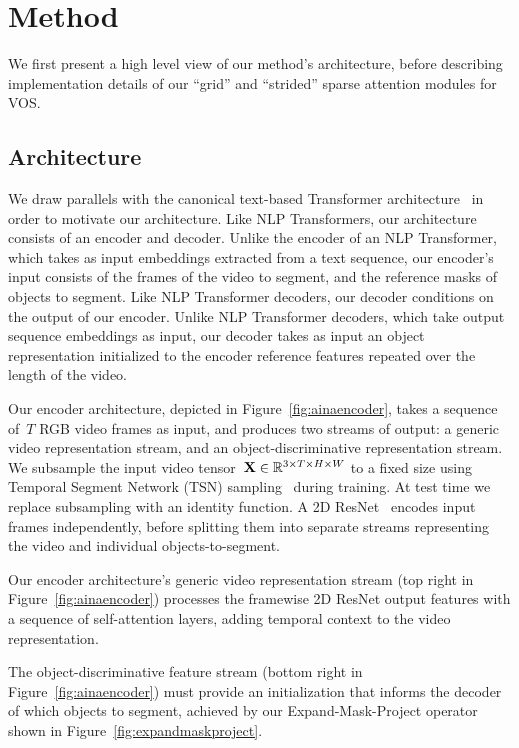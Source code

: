 \section{Method}

We first present a high level view of our method's architecture, before
describing implementation details of our ``grid'' and ``strided'' sparse
attention modules for VOS\@.


\subsection{Architecture}
\label{sec:architecture}

We draw parallels with the canonical text-based Transformer
architecture~\cite{vaswani2017attention} in order to motivate our architecture.
Like NLP Transformers, our architecture consists of an encoder and decoder.
Unlike the encoder of an NLP Transformer, which takes as input embeddings
extracted from a text sequence, our encoder's input consists of the frames of
the video to segment, and the reference masks of objects to segment.
Like NLP Transformer decoders, our decoder conditions on the output of our
encoder.
Unlike NLP Transformer decoders, which take output sequence embeddings as
input, our decoder takes as input an object representation initialized to the
encoder reference features repeated over the length of the video.

Our encoder architecture, depicted in Figure~\ref{fig:ainaencoder}, takes a
sequence of~$T$ RGB video frames as input, and produces two streams of output:
a generic video representation stream, and an object-discriminative
representation stream.
We subsample the input video
tensor~$\mathbf{X}{} \in \mathbb{R}{}^{3\times T \times H\times W}$ to a fixed size
using Temporal Segment Network (TSN) sampling~\cite{wang2016temporal} during
training.
At test time we replace subsampling with an identity function.
A 2D ResNet~\cite{he2016deep} encodes input frames independently, before
splitting them into separate streams representing the video and individual
objects-to-segment.

Our encoder architecture's generic video representation stream (top right in
Figure~\ref{fig:ainaencoder}) processes the framewise 2D ResNet output features
with a sequence of self-attention layers, adding temporal context to the video
representation.

The object-discriminative feature stream (bottom right in
Figure~\ref{fig:ainaencoder}) must provide an initialization that informs the
decoder of which objects to segment, achieved by our Expand-Mask-Project
operator shown in Figure~\ref{fig:expandmaskproject}.

